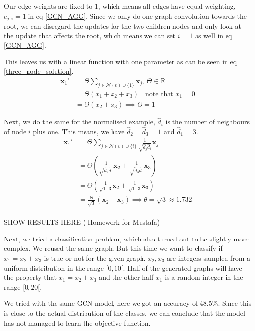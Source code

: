 \documentclass[a4paper,12pt]{article}
\begin{document}
Our edge weights are fixed to 1, which means all edges have equal weighting, \(e_{j, i}=1\) in eq \ref{GCN_AGG}. Since we only do one graph convolution towards the root, we can disregard the updates for the two children nodes and only look at the update that affects the root, which means we can set \(i=1\) as well in eq \ref{GCN_AGG}.

This leaves us with a linear function with one parameter as can be seen in eq \ref{three_node_solution}.
\begin{align} \label{three_node_solution}
  \mathbf{x}_1' &= \Theta \sum_{j \in \mathcal{N}(v) \cup \{1\}} \mathbf{x}_j,\ \Theta \in \mathbb{R}\\
   &= \Theta (x_{1} + x_{2} + x_{3}) \quad \text{note that } x_{1} = 0\\
                &= \Theta (x_{2} + x_{3}) \implies \Theta = 1
\end{align}

Next, we do the same for the normalised example, \(\hat{d}_{i}\) is the number of neighbours of node \(i\) plus one. This means, we have \(\hat{d}_{2} = \hat{d}_{3} = 1\) and \(\hat{d}_{1}=3\).
\begin{align}
  \mathbf{x}_1' &= \Theta \sum_{j \in \mathcal{N}(v) \cup \{i\}} \frac{1}{\sqrt{\hat{d}_j \hat{d}_i}} \mathbf{x}_j\\
  &= \Theta  \left( \frac{1}{\sqrt{\hat{d}_2 \hat{d}_1}} \mathbf{x}_2 +  \frac{1}{\sqrt{\hat{d}_3 \hat{d}_1}} \mathbf{x}_3 \right)\\
  &= \Theta  \left( \frac{1}{\sqrt{1 \cdot 3}} \mathbf{x}_2 +  \frac{1}{\sqrt{1 \cdot 3}} \mathbf{x}_3 \right)\\
  &= \frac{\Theta}{\sqrt{3}}  \left(  \mathbf{x}_2 +   \mathbf{x}_3 \right) \implies \theta = \sqrt{3} \approx 1.732\\
\end{align}

SHOW RESULTS HERE (
Homework for Mustafa)

Next, we tried a classification problem, which also turned out to be slightly more complex. We reused the same graph. But this time we want to classify if \(x_{1} = x_{2}+x_{3}\) is true or not for the given graph. \(x_2, x_3\) are integers sampled from a uniform distribution in the range \([0, 10[\). Half of the generated graphs will have the property that \(x_{1} = x_{2}+x_{3}\) and the other half \(x_1\) is a random integer in the range \([0, 20[\).

We tried with the same GCN model, here we got an accuracy of 48.5\%. Since this is close to the actual distribution of the classes, we can conclude that the model has not managed to learn the objective function.
\end{document}

